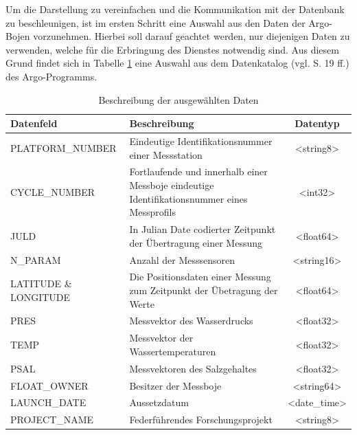 Um die Darstellung zu vereinfachen und die Kommunikation mit der Datenbank zu beschleunigen, ist im ersten Schritt eine Auswahl aus den Daten der Argo-Bojen vorzunehmen. Hierbei soll darauf geachtet werden, nur diejenigen Daten zu verwenden, welche für die Erbringung des Dienstes notwendig sind. Aus diesem Grund findet sich in Tabelle \ref{table:Datenauswahl} eine Auswahl aus dem Datenkatalog (vgl. \cite{ArgoUserManual} S. 19 ff.) des Argo-Programms. \\
\begin{table}
\centering
  \begin{tabular}{ | l | p{7cm}| c |}
    \hline
    \textbf{Datenfeld} & \textbf{Beschreibung} & \textbf{Datentyp} \\\hline

    PLATFORM\_NUMBER
        &  Eindeutige Identifikationsnummer einer Messstation
        & <string8>
        \\\hline

    CYCLE\_NUMBER
        &  Fortlaufende und innerhalb einer Messboje eindeutige Identifikationsnummer eines Messprofils
        & <int32>
        \\\hline

    JULD
        & In Julian Date codierter Zeitpunkt der Übertragung  einer Messung
        & <float64>
       \\\hline

    N\_PARAM
        & Anzahl der Messsensoren
        & <string16>
        \\\hline

    LATITUDE \& LONGITUDE
        & Die Positionsdaten einer Messung zum Zeitpunkt der Übetragung der Werte
        & <float64>
        \\\hline
    PRES
        & Messvektor des Wasserdrucks
        & <float32>
        \\\hline
    TEMP
        & Messvektor der Wassertemperaturen
        & <float32>
          \\\hline
    PSAL
        & Messvektoren des Salzgehaltes
        & <float32>
         \\\hline
    FLOAT\_OWNER
        & Besitzer der Messboje
        & <string64>
        \\\hline
    LAUNCH\_DATE
        & Aussetzdatum
        & <date\_time>
        \\\hline
    PROJECT\_NAME
        & Federführendes Forschungsprojekt
        & <string8>
        \\\hline
    \end{tabular}
      \caption{Beschreibung der ausgewählten Daten}
      \label{table:Datenauswahl}
\end{table}

